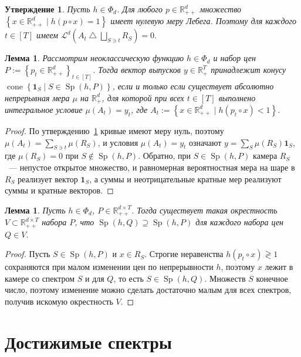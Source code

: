 \documentclass[a4paper,11pt]{article}
\theoremstyle{plain}
\newtheorem{lemma}[theorem]{Лемма}
\newtheorem{proposition}[theorem]{Утверждение}
\theoremstyle{definition}
\theoremstyle{remark}
\newcommand{\R}{\mathbb{R}}
\newcommand{\set}[1]{\left\{ #1 \right\}}
\newcommand{\Rpp}[1][2]{\R^{#1}_{++}} %
\newcommand{\Rp}[1][2]{\R^{#1}_{+}}   %
\DeclareMathOperator{\cone}{cone}
\DeclareMathOperator{\Sp}{Sp}
\begin{document}
\begin{proposition}\label{prop:null}
    Пусть $h\in\Phi_d$. Для любого $p\in\Rpp[d]$ множество
    $\set{x\in\Rpp[d]\mid h(p\circ x)=1}$ имеет нулевую меру
    Лебега. Поэтому для каждого $t\in[T]$ имеем $\mathcal{L}^d\left(
        A_t\mathbin{\triangle}\bigsqcup_{S\ni t}R_S
        \right)=0.$
\end{proposition}

\begin{lemma}\label{lem:signature}
    Рассмотрим неоклассическую функцию $h\in\Phi_{d}$ и набор цен $P:=\set{p_t\in\Rpp[d]}_{t\in[T]}$. Тогда вектор выпусков $y\in\Rp[T]$ принадлежит конусу $\cone\set{\mathbf 1_S\mid S\in\Sp(h,P)}$, если и только если существует абсолютно непрерывная мера $\mu$ на $\Rp[d]$, для которой при всех $t\in[T]$ выполнено интегральное условие $\mu(A_t)=y_t$, где $A_t:=\set{x\in\Rpp[d]\mid h(p_t\circ x)<1}$.
\end{lemma}

\begin{proof}
    По утверждению~\ref{prop:null} кривые имеют меру нуль, поэтому $\mu(A_t)=\sum_{S\ni t}\mu(R_S)$, и условия $\mu(A_t)=y_t$ означают $y=\sum_S\mu(R_S)\mathbf 1_S$, где $\mu(R_S)=0$ при $S\notin\Sp(h,P)$. Обратно, при $S\in\Sp(h,P)$ камера $R_S$~--- непустое открытое множество, и равномерная вероятностная мера на шаре в $R_S$ реализует вектор $\mathbf 1_S$, а суммы и неотрицательные кратные мер реализуют суммы и кратные векторов.
\end{proof}

\begin{lemma}\label{lem:stability}
    Пусть $h\in\Phi_d$, $P\in\Rpp[d\times T]$. Тогда существует такая окрестность $V\subset\Rpp[d\times T]$ набора $P$, что $\Sp(h,Q)\supseteq\Sp(h,P)$ для каждого набора цен $Q\in V$.
\end{lemma}

\begin{proof}
    Пусть $S\in\Sp(h,P)$ и $x\in R_S$. Строгие неравенства $h(p_t\circ x)\gtrless1$ сохраняются при малом изменении цен по непрерывности $h$, поэтому $x$ лежит в камере со спектром $S$ и для $Q$, то есть $S\in\Sp(h,Q)$. Множеств $S$ конечное число, поэтому изменение можно сделать достаточно малым для всех спектров, получив искомую окрестность $V$.
\end{proof}

\section{Достижимые спектры}
\end{document}
